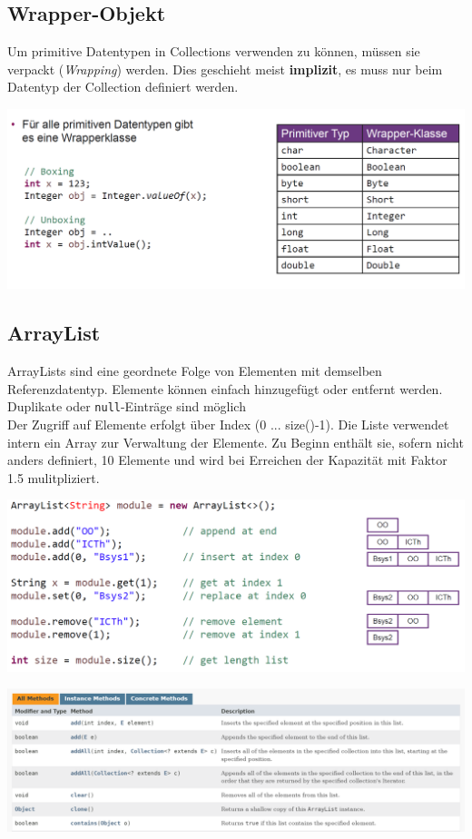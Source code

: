 \subsection{Wrapper-Objekt}
Um primitive Datentypen in Collections verwenden zu können, müssen sie verpackt (\textit{Wrapping}) werden. Dies geschieht
meist \textbf{implizit}, es muss nur beim Datentyp der Collection definiert werden.
\begin{center}
    \includegraphics[width=\columnwidth]{pictures/wrapper-klassen.png}
\end{center}

\subsection{ArrayList}
ArrayLists sind eine geordnete Folge von Elementen mit demselben Referenzdatentyp. Elemente können einfach 
hinzugefügt oder entfernt werden. Duplikate oder \verb|null|-Einträge sind möglich\\
Der Zugriff auf Elemente erfolgt über Index (0 ... size()-1). Die Liste verwendet intern ein Array zur Verwaltung der Elemente.
Zu Beginn enthält sie, sofern nicht anders definiert, 10 Elemente und wird bei Erreichen der Kapazität mit Faktor 1.5 mulitpliziert.

\begin{center}
    \includegraphics[width=0.9\columnwidth]{pictures/arrayList-bsp.png}
\end{center}

\begin{center}
    \includegraphics[width=0.9\columnwidth]{pictures/arrayList-api.png}
\end{center}

